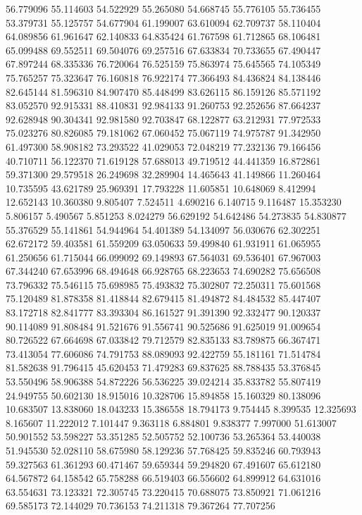 56.779096
55.114603
54.522929
55.265080
54.668745
55.776105
55.736455
53.379731
55.125757
54.677904
61.199007
63.610094
62.709737
58.110404
64.089856
61.961647
62.140833
64.835424
61.767598
61.712865
68.106481
65.099488
69.552511
69.504076
69.257516
67.633834
70.733655
67.490447
67.897244
68.335336
76.720064
76.525159
75.863974
75.645565
74.105349
75.765257
75.323647
76.160818
76.922174
77.366493
84.436824
84.138446
82.645144
81.596310
84.907470
85.448499
83.626115
86.159126
85.571192
83.052570
92.915331
88.410831
92.984133
91.260753
92.252656
87.664237
92.628948
90.304341
92.981580
92.703847
68.122877
63.212931
77.972533
75.023276
80.826085
79.181062
67.060452
75.067119
74.975787
91.342950
61.497300
58.908182
73.293522
41.029053
72.048219
77.232136
79.166456
40.710711
56.122370
71.619128
57.688013
49.719512
44.441359
16.872861
59.371300
29.579518
26.249698
32.289904
14.465643
41.149866
11.260464
10.735595
43.621789
25.969391
17.793228
11.605851
10.648069
8.412994
12.652143
10.360380
9.805407
7.524511
4.690216
6.140715
9.116487
15.353230
5.806157
5.490567
5.851253
8.024279
56.629192
54.642486
54.273835
54.830877
55.376529
55.141861
54.944964
54.401389
54.134097
56.030676
62.302251
62.672172
59.403581
61.559209
63.050633
59.499840
61.931911
61.065955
61.250656
61.715044
66.099092
69.149893
67.564031
69.536401
67.967003
67.344240
67.653996
68.494648
66.928765
68.223653
74.690282
75.656508
73.796332
75.546115
75.698985
75.493832
75.302807
72.250311
75.601568
75.120489
81.878358
81.418844
82.679415
81.494872
84.484532
85.447407
83.172718
82.841777
83.393304
86.161527
91.391390
92.332477
90.120337
90.114089
91.808484
91.521676
91.556741
90.525686
91.625019
91.009654
80.726522
67.664698
67.033842
79.712579
82.835133
83.789875
66.367471
73.413054
77.606086
74.791753
88.089093
92.422759
55.181161
71.514784
81.582638
91.796415
45.620453
71.479283
69.837625
88.788435
53.376845
53.550496
58.906388
54.872226
56.536225
39.024214
35.833782
55.807419
24.949755
50.602130
18.915016
10.328706
15.894858
15.160329
80.138096
10.683507
13.838060
18.043233
15.386558
18.794173
9.754445
8.399535
12.325693
8.165607
11.222012
7.101447
9.363118
6.884801
9.838377
7.997000
51.613007
50.901552
53.598227
53.351285
52.505752
52.100736
53.265364
53.440038
51.945530
52.028110
58.675980
58.129236
57.768425
59.835246
60.793943
59.327563
61.361293
60.471467
59.659344
59.294820
67.491607
65.612180
64.567872
64.158542
65.758288
66.519403
66.556602
64.899912
64.631016
63.554631
73.123321
72.305745
73.220415
70.688075
73.850921
71.061216
69.585173
72.144029
70.736153
74.211318
79.367264
77.707256

